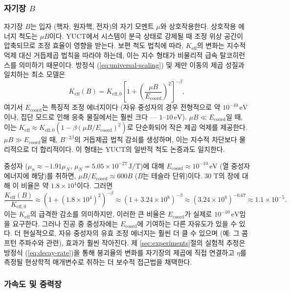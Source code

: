 \documentclass[11pt,a4paper]{article}
\theoremstyle{remark}
\newcommand{\Keff}{K_{\mathrm{eff}}}
\newcommand{\Keffzero}{K_{\mathrm{eff},0}}
\begin{document}
	\subsubsection{자기장 \(B\)}
	
	자기장 \(B\)는 입자 (핵자, 원자핵, 전자)의 자기 모멘트 \(\mu\)와 상호작용한다. 상호작용 에너지 척도는 \(\mu B\)이다. YUCT에서 시스템이 분극 상태로 강제될 때 조정 위상 공간이 압축되므로 조정 효율이 영향을 받는다. 보편 척도 법칙에 따라, \(\Keff\)의 변화는 지수적 억제 대신 거듭제곱 법칙을 따라야 하는데, 이는 지수 형태가 비물리적 급속 탈코히런스를 의미하기 때문이다. 방정식 (\ref{eq:universal-scaling}) 및 제만 이동의 제곱 성질과 일치하는 최소 모델은
	\begin{equation}
		\Keff(B) = \Keffzero \left[ 1 + \left( \frac{\mu B}{E_{\mathrm{coord}}} \right)^2 \right]^{-\beta},
		\label{eq:keff-B}
	\end{equation}
	여기서 \(E_{\mathrm{coord}}\)는 특징적 조정 에너지이다 (자유 중성자의 경우 전형적으로 약 \(10^{-10}\,\text{eV}\)이나, 집단 모드로 인해 응축 물질에서는 훨씬 크다 — \(1\)–\(10\,\text{eV}\)). \(\mu B \ll E_{\mathrm{coord}}\)일 때, 이는 \(\Keff \approx \Keffzero (1 - \beta (\mu B/E_{\mathrm{coord}})^2)\)로 단순화되어 작은 제곱 억제를 제공한다. \(\mu B \gg E_{\mathrm{coord}}\)일 때, \(B^{-2\beta}\)의 거듭제곱 법칙 감쇠를 생성하며, 이는 지수적 차단보다 물리적으로 더 합리적이다. 이 형태는 YUCT의 일반적 척도 논증과도 일치한다.
	
	중성자 (\(\mu_n \approx -1.91\mu_N\), \(\mu_N = 5.05\times 10^{-27}\,\text{J/T}\))에 대해 \(E_{\mathrm{coord}} \approx 10^{-10}\,\text{eV}\) (열 중성자 에너지에 해당)를 취하면, \(\mu B / E_{\mathrm{coord}} \approx 600 B\) (\(B\)는 테슬라 단위)이다. 30 T의 장에 대해 이 비율은 약 \(1.8\times10^4\)이다. 그러면
	\[
	\frac{\Keff(B)}{\Keffzero} \approx (1 + (1.8\times10^4)^2)^{-\beta} \approx (1 + 3.24\times10^8)^{-\beta} \approx (3.24\times10^8)^{-0.67} \approx 1.1\times10^{-5}.
	\]
	이는 \(\Keff\)의 급격한 감소를 의미하지만, 이러한 큰 비율은 \(E_{\mathrm{coord}}\)가 실제로 \(10^{-10}\,\text{eV}\)임을 요구한다. 그러나 진공 중 중성자에는 \(E_{\mathrm{coord}}\)에 기여하는 다른 자유도가 있을 수 있다. 더 현실적으로, 자유 중성자의 유효 조정 에너지는 훨씬 더 클 수 있으며 (예: 그 콤프턴 주파수와 관련), 효과가 훨씬 작아진다. 제 \ref{sec:experiments}절의 실험적 추정은 방정식 (\ref{eq:decay-rate})을 통해 붕괴율의 변화를 자기장의 제곱에 직접 연결하고 \(\eta\)를 측정될 현상학적 매개변수로 취하는 더 보수적 접근법을 채택한다.
	
	\subsubsection{가속도 및 중력장}
	
\end{document}
